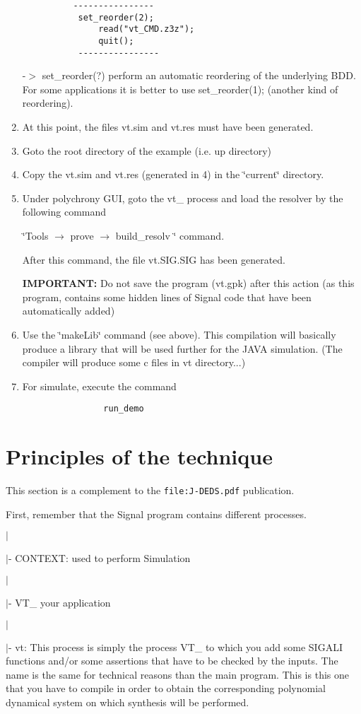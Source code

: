 \begin{enumerate}
\footnotesize\begin{verbatim}	       ----------------
	       set_reorder(2); 
               read("vt_CMD.z3z");
               quit();
	       ----------------
	     \end{verbatim}
\normalsize
 -$>$ set\_\-reorder(?) perform an automatic reordering of the underlying BDD. For some applications it is better to use set\_\-reorder(1); (another kind of reordering).\item At this point, the files vt.sim and vt.res must have been generated.\item Goto the root directory of the example (i.e. up directory)\item Copy the vt.sim and vt.res (generated in 4) in the \char`\"{}current\char`\"{} directory.\item Under polychrony GUI, goto the vt\_ process and load the resolver by the following command \par
 \char`\"{}Tools  $\rightarrow$  prove  $\rightarrow$  build\_\-resolv \char`\"{} command.\par
 After this command, the file vt.SIG.SIG has been generated.\par
 {\bf IMPORTANT:} Do not save the program (vt.gpk) after this action (as this program, contains some hidden lines of Signal code that have been automatically added)\item Use the \char`\"{}make\-Lib\char`\"{} command (see above). This compilation will basically produce a library that will be used further for the JAVA simulation. (The compiler will produce some c files in vt directory...)\item For simulate, execute the command 

\footnotesize\begin{verbatim}                run_demo
              \end{verbatim}
\normalsize
\end{enumerate}
\section{Principles of the technique}\label{index_sectC}
This section is a complement to the  {\tt file:J-DEDS.pdf}  publication.

First, remember that the Signal program contains different processes. \par
 $|$\par
 $|$- CONTEXT: used to perform Simulation \par
 $|$\par
 $|$- VT\_ your application\par
 $|$\par
 $|$- vt: This process is simply the process VT\_ to which you add some SIGALI functions and/or some assertions that have to be checked by the inputs. The name is the same for technical reasons than the main program. This is this one that you have to compile in order to obtain the corresponding polynomial dynamical system on which synthesis will be performed.

